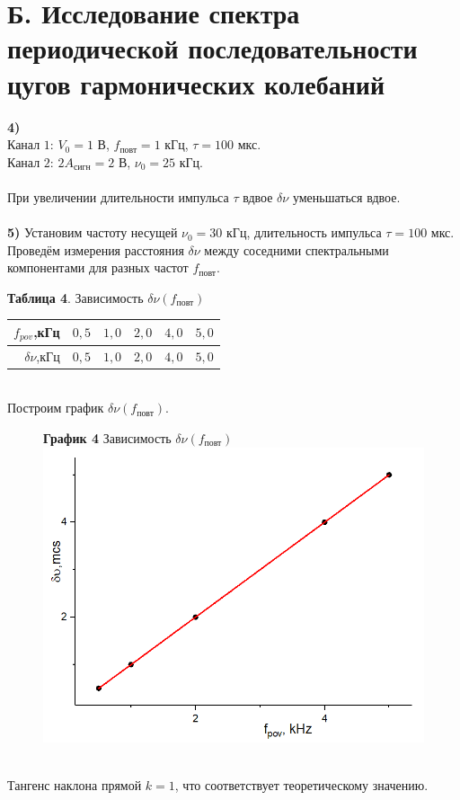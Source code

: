 \documentclass[11pt,a4paper]{article}
\begin{document}
\part*{Б. Исследование спектра периодической последовательности цугов гармонических колебаний}
\textbf{4)}\\
Канал $1$: $V_0 = 1$ В, $f_{\text{повт}}=1$ кГц, $\tau=100$ мкс.\\
Канал $2$: $2A_{\text{сигн}} = 2$ В, $\nu_0 = 25$ кГц.\\\\
При увеличении длительности импульса $\tau$ вдвое $\delta \nu$ уменьшаться вдвое.\\\\
\textbf{5)} Установим частоту несущей $\nu_0 = 30$ кГц, длительность импульса $\tau = 100$ мкс. Проведём измерения расстояния $\delta \nu$ между соседними спектральными компонентами для разных частот $f_{\text{повт}}$.
\begin{table}[h!]
	\centering
	\textbf{Таблица 4}. Зависимость $\delta \nu (f_{\text{повт}})$ \\
	\begin{tabular}{|r||c|c|c|c|c|}
		\hline 
		$f_{pov}$,кГц & $0,5$ & $1,0$ & $2,0$ & $4,0$ & $5,0$ \\ 
		\hline
		$\delta\nu$,кГц & $0,5$ & $1,0$ & $2,0$ & $4,0$ & $5,0$ \\ 
		\hline
	\end{tabular}
\end{table}
\\
Построим график $\delta \nu (f_{\text{повт}})$.
\begin{figure} [h!]
	\centering
	\textbf{График 4} Зависимость $\delta \nu (f_{\text{повт}})$ \\
	\centering
	\includegraphics[width=0.6\linewidth]{3}
\end{figure}
\\
Тангенс наклона прямой $k=1$, что соответствует теоретическому значению.
\end{document}
